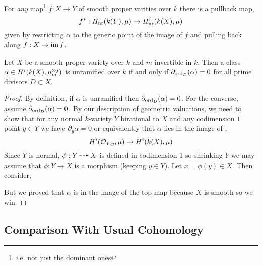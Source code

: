\documentclass[12pt]{article}
\begin{document}
\begin{cor}
For \textit{any} map\footnote{i.e. not just the dominant ones} $f : X \to Y$ of smooth proper varities over $k$ there is a pullback map,
\[ f^* : H_{\mathrm{nr}}(k(Y), \mu) \to H_{\mathrm{nr}}^i(k(X), \mu) \]
given by restricting $\alpha$ to the generic point of the image of $f$ and pulling back along $f : X \to \operatorname{\mathrm{im}}{f}$.
\end{cor}

\begin{prop}
Let $X$ be a smooth proper variety over $k$ and $m$ invertible in $k$. Then a class $\alpha \in H^i(k(X), \mu_m^{\otimes j})$ is unramified over $k$ if and only if $\partial_{\operatorname{\mathrm{ord}}_D}(\alpha) = 0$ for all prime divisors $D \subset X$.
\end{prop}

\begin{proof}
By definition, if $\alpha$ is unramified then $\partial_{\operatorname{\mathrm{ord}}_D}(\alpha) = 0$. For the converse, assume $\partial_{\operatorname{\mathrm{ord}}_D}(\alpha) = 0$. By our description of geometric valuations, we need to show that for any normal $k$-variety $Y$ birational to $X$ and any codimension $1$ point $y \in Y$ we have $\partial_y \alpha = 0$ or equivalently that $\alpha$ lies in the image of ,
\[ H^i(\mathcal{O}_{Y, y}, \mu) \to H^i(k(X), \mu) \]
Since $Y$ is normal, $\phi : Y \rat X$ is defined in codimension $1$ so shrinking $Y$ we may assume that $\phi : Y \to X$ is a morphism (keeping $y \in Y$). Let $x = \phi(y) \in X$. Then consider,
\begin{center}
\end{center}
But we proved that $\alpha$ is in the image of the top map because $X$ is smooth so we win. 
\end{proof}

\subsection{Comparison With Usual Cohomology}
\end{document}
